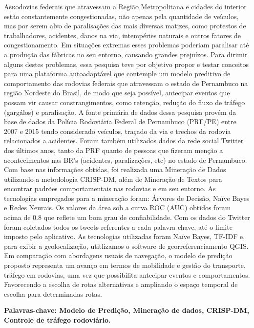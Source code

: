 \vspace*{12pt}

\lettrine {As} rodovias federais que atravessam a Região
Metropolitana e cidades do interior estão constantemente
congestionadas, não apenas pela quantidade de veículos,
mas por serem alvo de paralisações das mais diversas
matizes, como protestos de trabalhadores, acidentes,
danos na via, intempéries naturais e outros fatores de
congestionamento. Em situações extremas esses problemas
poderiam paralisar até a produção das fábricas no seu
entorno, causando grandes prejuízos. Para dirimir alguns
destes problemas, essa pesquisa teve por objetivo propor e testar conceitos 
para uma plataforma autoadaptável que contemple um modelo preditivo de comportamento das rodovias federais que
atravessam o estado de Pernambuco na região Nordeste do
Brasil, de modo que seja possível, antecipar eventos que
possam vir causar constrangimentos, como retenção, redução do fluxo de tráfego (gargálos) e paralisação. A fonte primária de dados
dessa pesquisa provém da base de dados da Polícia 
Rodoviária Federal de Pernambuco (PRF/PE) entre 2007 e 2015 tendo considerado veículos, traçado da via e trechos da
rodovia relacionados a acidentes. Foram também utilizados dados da rede social Twitter dos últimos anos, tanto da PRF quanto de 
pessoas que fizeram menção a acontecimentos nas BR's (acidentes, paralizações, etc) no estado de Pernambuco. 
Com base nas informações obtidas, foi realizada uma Mineração de Dados utilizando a metodologia CRISP-DM, além de Mineração de Textos para encontrar padrões comportamentais nas rodovias e em seu
entorno. As tecnologias empregados para a mineração foram: Árvores de Decisão, Naïve Bayes e Redes Neurais. 
Os valores da área sob a curva ROC (AUC) obtidos foram
acima de 0.8 que reflete um bom grau de confiabilidade. Com os dados do Twitter foram coletados todos os tweets referentes a cada palavra chave, até o limite imposto pelo aplicativo. As tecnologias utilizadas foram Naïve Bayes, TF-IDF e, para exibir a geolocalização, utitlizamos o software de georreferenciamento QGIS.
Em comparação com abordagens usuais de navegação, o
modelo de predição proposto representa um avanço em
termos de mobilidade e gestão do transporte, tráfego em rodovias, uma vez que possibilita antecipar eventos e
comportamentos. Favorecendo a escolha de rotas alternativas e ampliando o espaço temporal de escolha para determinadas rotas. 


\par
\vspace{2em}
\noindent\textbf{Palavras-chave: Modelo de Predição, Mineração de dados, CRISP-DM, Controle de tráfego rodoviário.}